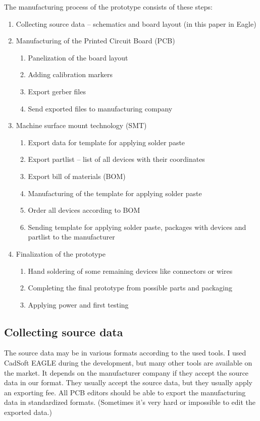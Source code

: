 The manufacturing process of the prototype consists of these steps:
\begin{enumerate}
	\item Collecting source data -- schematics and board layout (in this paper in Eagle)
	\item Manufacturing of the Printed Circuit Board (PCB)
	\begin{enumerate}
		\item Panelization of the board layout
		\item Adding calibration markers
		\item Export gerber files
		\item Send exported files to manufacturing company
	\end{enumerate}
	\item Machine surface mount technology (SMT)
	\begin{enumerate}
		\item Export data for template for applying solder paste
		\item Export partlist -- list of all devices with their coordinates
		\item Export bill of materials (BOM)
		\item Manufacturing of the template for applying solder paste
		\item Order all devices according to BOM
		\item Sending template for applying solder paste, packages with devices and partlist to the manufacturer
	\end{enumerate}
	\item Finalization of the prototype
	\begin{enumerate}
		\item Hand soldering of some remaining devices like connectors or wires
		\item Completing the final prototype from possible parts and packaging
		\item Applying power and first testing
	\end{enumerate}
\end{enumerate}

\subsection{Collecting source data}
The source data may be in various formats according to the used tools. I used CadSoft EAGLE \cite{EAGLE} during the development, but many other tools are available on the market. It depends on the manufacturer company if they accept the source data in our format. They usually accept the source data, but they usually apply an exporting fee. All PCB editors should be able to export the manufacturing data in standardized formats. (Sometimes it's very hard or impossible to edit the exported data.)


